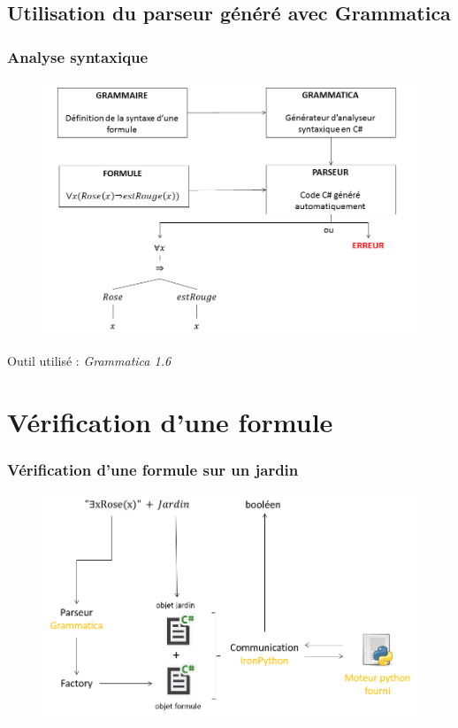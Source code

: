 \documentclass{beamer}
\begin{document}
\subsection{Utilisation du parseur généré avec Grammatica}
\begin{frame}
\frametitle{Analyse syntaxique}
\begin{center}
\begin{figure}[!h]
\includegraphics[scale=0.35]{syntaxTree.png}
\end{figure}
Outil utilisé : \textit{Grammatica 1.6}
\end{center}
\end{frame}



\section{Vérification d'une formule}
\begin{frame}
\frametitle{Vérification d'une formule sur un jardin}
\begin{center}
\begin{figure}[!h]
\includegraphics[scale=0.4]{verification.png}
\end{figure}
\end{center}
\end{frame}
\end{document}
